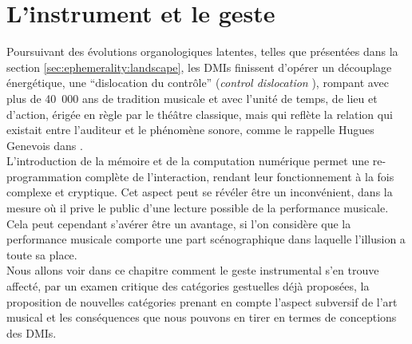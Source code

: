 %
\chapter{L'instrument et le geste}
\label{ch:gesture}



\vspace*{\fill}

\noindent Poursuivant des évolutions organologiques latentes, telles que présentées dans la section \ref{sec:ephemerality:landscape}, les \glspl{DMI} finissent d'opérer un découplage énergétique, une ``dislocation du contrôle'' (\textit{control dislocation} \cite{miranda_new_2006}), rompant avec plus de 40~000 ans de tradition musicale \cite{conard_new_2009} et avec l'unité de temps, de lieu et d'action, érigée en règle par le théâtre classique, mais qui reflète la relation qui existait entre l'auditeur et le phénomène sonore, comme le rappelle Hugues Genevois dans \cite{cance_what_2012}.\\
\indent L'introduction de la mémoire et de la computation numérique permet une re-programmation complète de l'interaction, rendant leur fonctionnement à la fois complexe et cryptique. Cet aspect peut se révéler être un inconvénient, dans la mesure où il prive le public d’une lecture possible de la performance musicale. Cela peut cependant s’avérer être un avantage, si l'on considère que la performance musicale comporte une part scénographique dans laquelle l’illusion a toute sa place. \\
\indent Nous allons voir dans ce chapitre comment le geste instrumental s'en trouve affecté, par un examen critique des catégories gestuelles déjà proposées, la proposition de nouvelles catégories prenant en compte l'aspect subversif de l'art musical et les conséquences que nous pouvons en tirer en termes de conceptions des \glspl{DMI}.

